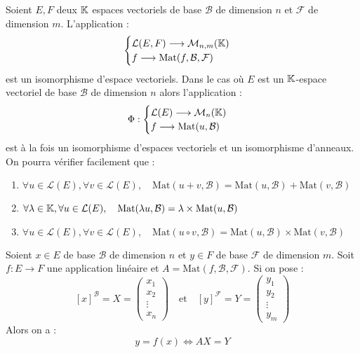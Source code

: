 \begin{proposition}
    Soient $E,F$ deux $\mathbb{K}$ espaces vectoriels de base $ \mathcal{B}$ de dimension $n$ et $ \mathcal{F}$
    de dimension $m$. L'application : 
    \[ 
        \begin{cases}
            \mathcal{L}(E,F) \longrightarrow \mathcal{M}_{n,m}(\mathbb{K}) \\ 
            f \longrightarrow \text{Mat}(f, \mathcal{B}, \mathcal{F})
        \end{cases}
    \] 
    est un isomorphisme d'espace vectoriels. Dans le cas où $E$ est un $\mathbb{K}$-espace vectoriel 
    de base $ \mathcal{B}$ de dimension $n$ alors l'application : 
    \[ \Phi : 
        \begin{cases}
            \mathcal{L}(E) \longrightarrow \mathcal{M}_n(\mathbb{K}) \\ 
            f \longrightarrow \text{Mat}(u, \mathcal{B})
        \end{cases}
    \] 
    est à la fois un isomorphisme d'espaces vectoriels et un isomorphisme d'anneaux. On pourra vérifier facilement que : 
    \begin{enumerate}
        \item $ \forall u \in \mathcal{L}(E), \forall v \in \mathcal{L}(E), \quad \text{Mat}(u + v, \mathcal{B}) = \text{Mat}(u, \mathcal{B}) + \text{Mat}(v, \mathcal{B}) $ 
        \item $ \forall \lambda \in \mathbb{K}, \forall u \in \mathcal{L}(E), \quad \text{Mat}(\lambda u, \mathcal{B}) = \lambda \times \text{Mat}(u, \mathcal{B})$ 
        \item $ \forall u \in \mathcal{L}(E), \forall v \in \mathcal{L}(E), \quad \text{Mat}(u \circ v, \mathcal{B}) = \text{Mat}(u, \mathcal{B}) \times \text{Mat}(v, \mathcal{B}) $ 
    \end{enumerate}
\end{proposition}

\begin{remark}
    Soient $x \in E$ de base $ \mathcal{B}$ de dimension $n$ et $y \in F$ de base $ \mathcal{F}$ 
    de dimension $m$. Soit $f : E \longrightarrow F$ une application linéaire et $A = \text{Mat}(f, \mathcal{B}, \mathcal{F})$. 
    Si on pose :
        \[ [x]^{ \mathcal{B}} = X = 
            \begin{pmatrix}
                x_1 \\ 
                x_2 \\ 
                \vdots \\ 
                x_n 
            \end{pmatrix}
            \quad 
            \text{et} \quad [y]^{ \mathcal{F}} = Y = 
            \begin{pmatrix}
                y_1 \\ 
                y_2 \\ 
                \vdots \\ 
                y_m 
            \end{pmatrix}
        \] 
    Alors on a : 
        \[ y = f(x) \iff AX = Y \] 
\end{remark}

